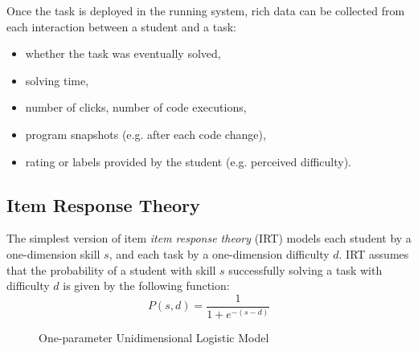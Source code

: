 Once the task is deployed in the running system,
  rich data can be collected from each interaction between a student and a task:
\begin{itemize}
  \item whether the task was eventually solved,
  \item solving time,
  \item number of clicks, number of code executions,
  \item program snapshots (e.g. after each code change),
  \item rating or labels provided by the student (e.g. perceived difficulty).
\end{itemize}


\subsection{Item Response Theory}
\label{sec:irt}

The simplest version of item \emph{item response theory} (IRT)
  \cite{irt-visual-guide}
  models each student by a one-dimension skill $s$,
  and each task by a one-dimension difficulty $d$.
IRT assumes that the probability of a student with skill $s$
  successfully solving a task with difficulty $d$
  is given by the following function:
  \begin{equation}\label{eq:logistic}
  P(s, d) = \frac{1}{1 + e^{-(s - d)}}
  \end{equation}

\begin{figure}[h]
  \centering
  \caption{One-parameter Unidimensional Logistic Model}
  \label{fig:logistic-model}
\end{figure}

